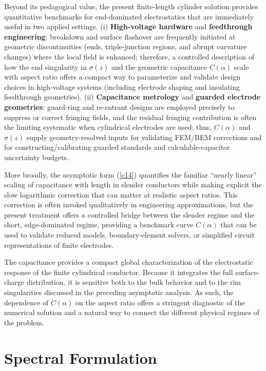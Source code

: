 \documentclass[12pt]{article}
\begin{document}
Beyond its pedagogical value, the present finite-length cylinder solution
provides quantitative benchmarks for end-dominated electrostatics that are
immediately useful in two applied settings. (i) \textbf{High-voltage hardware}
and \textbf{feedthrough engineering}: breakdown and surface flashover are
frequently initiated at geometric discontinuities (ends, triple-junction
regions, and abrupt curvature changes) where the local field is enhanced;
therefore, a controlled description of how the end singularity in $\sigma(z) $
and the geometric capacitance $C(\alpha)$ scale with aspect ratio offers a
compact way to parameterize and validate design choices in high-voltage
systems (including electrode shaping and insulating feedthrough
geometries)\cite{ap1,ap2,ap3,ap4,ap5}. (ii) \textbf{Capacitance metrology} and
\textbf{guarded electrode geometries}: guard-ring and re-entrant designs are
employed precisely to suppress or correct fringing fields, and the residual
fringing contribution is often the limiting systematic when cylindrical
electrodes are used; thus, $C(\alpha)$ and $\sigma(z)$ supply
geometry-resolved inputs for validating FEM/BEM corrections and for
constructing/calibrating guarded standards and calculable-capacitor
uncertainty budgets\cite{ap6,ap7,ap8,ap9}.

More broadly, the asymptotic form (\ref{c14}) quantifies the familiar ``nearly
linear'' scaling of capacitance with length in slender conductors while making
explicit the slow logarithmic correction that can matter at realistic aspect
ratios. This correction is often invoked qualitatively in engineering
approximations, but the present treatment offers a controlled bridge between
the slender regime and the short, edge-dominated regime, providing a benchmark
curve $C(\alpha)$ that can be used to validate reduced models,
boundary-element solvers, or simplified circuit representations of finite electrodes.

The capacitance provides a compact global characterization of the
electrostatic response of the finite cylindrical conductor. Because it
integrates the full surface-charge distribution, it is sensitive both to the
bulk behavior and to the rim singularities discussed in the preceding
asymptotic analysis. As such, the dependence of $C(\alpha)$ on the aspect
ratio offers a stringent diagnostic of the numerical solution and a natural
way to connect the different physical regimes of the problem.

\section{Spectral Formulation}
\end{document}
